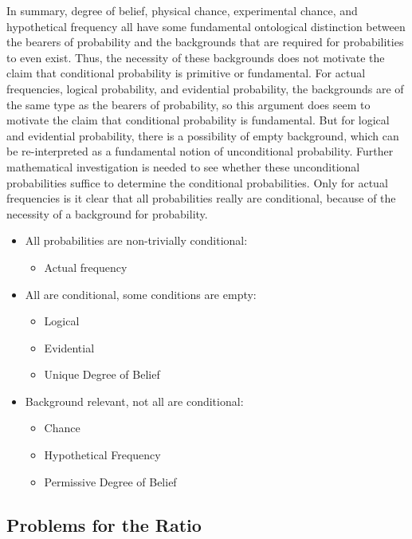 In summary, degree of belief, physical chance, experimental chance, and hypothetical frequency all have some fundamental ontological distinction between the bearers of probability and the backgrounds that are required for probabilities to even exist. Thus, the necessity of these backgrounds does not motivate the claim that conditional probability is primitive or fundamental. For actual frequencies, logical probability, and evidential probability, the backgrounds are of the same type as the bearers of probability, so this argument does seem to motivate the claim that conditional probability is fundamental. But for logical and evidential probability, there is a possibility of empty background, which can be re-interpreted as a fundamental notion of unconditional probability. Further mathematical investigation is needed to see whether these unconditional probabilities suffice to determine the conditional probabilities. Only for actual frequencies is it clear that all probabilities really are conditional, because of the necessity of a background for probability.
\begin{itemize}
\item All probabilities are non-trivially conditional:
  \begin{itemize}
  \item Actual frequency
  \end{itemize}
\item All are conditional, some conditions are empty:
  \begin{itemize}
  \item Logical
  \item Evidential
  \item Unique Degree of Belief
  \end{itemize}
\item Background relevant, not all are conditional:
  \begin{itemize}
  \item Chance
  \item Hypothetical Frequency
  \item Permissive Degree of Belief
  \end{itemize}
\end{itemize}  


\subsection{Problems for the Ratio}\label{noratio}

